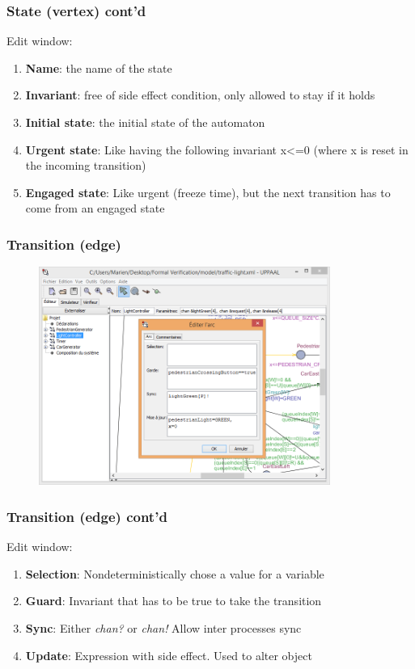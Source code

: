 \documentclass{bredelebeamer}
\begin{document}
\begin{frame}
	\frametitle{State (vertex) cont'd}
	\begin{block}{Edit window:}
		\begin{enumerate}
			\item \textbf{Name}: the name of the state
			\item \textbf{Invariant}: free of side effect condition, only allowed to stay if it holds
			\item \textbf{Initial state}: the initial state of the automaton
			\item \textbf{Urgent state}: Like having the following invariant x<=0 (where x is reset in the incoming transition)
			\item \textbf{Engaged state}: Like urgent (freeze time), but the next transition has to come from an engaged state
		\end{enumerate}
	\end{block}
\end{frame}

\begin{frame}
	\frametitle{Transition (edge)}
	\begin{figure}
    	\centering
    	\includegraphics[width = 0.85\textwidth]{uppaal_edge_editor.png}
  	\end{figure}
\end{frame}

\begin{frame}
	\frametitle{Transition (edge) cont'd}
	\begin{block}{Edit window:}
		\begin{enumerate}
			\item \textbf{Selection}: Nondeterministically chose a value for a variable
			\item \textbf{Guard}: Invariant that has to be true to take the transition
			\item \textbf{Sync}: Either \textit{chan?} or \textit{chan!} Allow inter processes sync
			\item \textbf{Update}: Expression with side effect. Used to alter object
		\end{enumerate}
	\end{block}
\end{frame}
\end{document}
